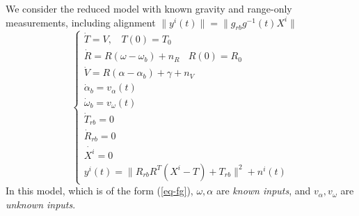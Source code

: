 \documentclass[]{article}
\newcommand{\bc}{\begin{cases}}
\newcommand{\ec}{\end{cases}}
\def\w{\omega}
\newtheorem{theorem}{Theorem}
\begin{document}
We consider the reduced model with known gravity and range-only measurements, including alignment $\| y^i(t) \| = \| g_{rb}g^{-1}(t)X^i\|$
\begin{equation}
\bc
\dot T = V, ~~~~ T(0) = T_0 \\
\dot R = R(\w - \w_b) +n_R ~~~~ R(0) = R_0\\
\dot V = R(\alpha - \alpha_b) + \gamma + n_V\\ 
\dot \alpha_b = v_\alpha(t) \\
\dot \w_b = v_\w(t) \\
\dot T_{rb} = 0 \\
\dot R_{rb} = 0\\
\dot{X^i} = 0 \\
y^i(t) = \| R_{rb} R^T(X^i - T) + T_{rb}\|^2 + n^i(t)
\ec 
\label{eq-range-imu}
\end{equation} 
In this model, which is of the form (\ref{eq-fg}), $\w, \alpha$ are {\em known inputs}, and $v_\alpha, v_\w$ are {\em unknown inputs}. 



\end{document}
